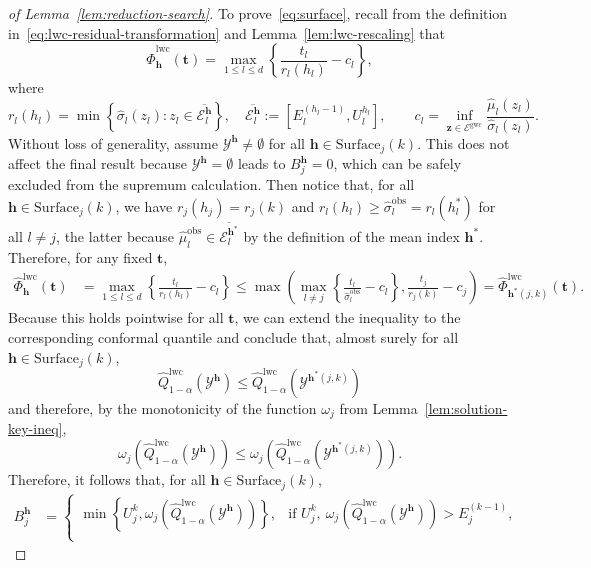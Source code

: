 \begin{proof}[of Lemma~\ref{lem:reduction-search}]
To prove~\eqref{eq:surface}, recall from the definition in~\eqref{eq:lwc-residual-transformation} and Lemma~\ref{lem:lwc-rescaling} that
\[
\hat{\Phi}^{\mathrm{lwc}}_{\mathbf{h}}(\mathbf t)  = \max_{1\leq l \leq d} \left\{\frac{t_l}{r_l(h_l)} - c_l\right\},
\]
where
\[
r_l(h_l) = \min\left\{\hat{\sigma}_l(z_l): z_l \in \overline{\mathcal{E}^{\mathbf{h}}_l}\right\},
\quad \overline{\mathcal{E}^{\mathbf{h}}_l} := \left[E^{(h_l-1)}_l, U^{h_l}_l\right],
\qquad c_l = \inf_{\mathbf z \in \mathcal{E}^{\mathrm{gwc}}}\frac{\hat{\mu}_l(z_l)}{\hat{\sigma}_l(z_l)}.
\]
Without loss of generality, assume $\mathcal{Y}^{\mathbf{h}} \neq \emptyset$ for all $\mathbf{h} \in \mathrm{Surface}_j(k)$. This does not affect the final result because $\mathcal{Y}^{\mathbf{h}} = \emptyset$ leads to $B^{\mathbf{h}}_j = 0$, which can be safely excluded from the supremum calculation. Then notice that, for all $\mathbf{h} \in \mathrm{Surface}_j(k)$, we have $r_j(h_j) = r_j(k)$ and $r_l(h_l) \geq \hat{\sigma}^\mathrm{obs}_l = r_l({h^*_l})$ for all $l \neq j$, the latter because $\hat{\mu}^\mathrm{obs}_l \in \overline{\mathcal{E}^{\mathbf{h}^*}_l}$ by the definition of the mean index $\mathbf{h}^*$. Therefore, for any fixed $\mathbf t$,
\begin{align*}
    \hat{\Phi}^{\mathrm{lwc}}_{\mathbf{h}}(\mathbf t) & = \max_{1\leq l \leq d} \left\{\frac{t_l}{r_l(h_l)} - c_l\right\}
    \leq  \max\left(\max_{l\neq j} \left\{\frac{t_l}{\hat{\sigma}^\mathrm{obs}_l} - c_l\right\}, \frac{t_j}{r_j(k)} - c_j\right)
    = \hat{\Phi}^{\mathrm{lwc}}_{\mathbf{h}^*(j,k)}(\mathbf t).
\end{align*}
Because this holds pointwise for all $\mathbf t$, we can extend the inequality to the corresponding conformal quantile and conclude that, almost surely for all $\mathbf{h} \in \mathrm{Surface}_j(k)$,
\[
\hat{Q}^\mathrm{lwc}_{1-\alpha}(\mathcal{Y}^{\mathbf{h}}) \leq \hat{Q}^\mathrm{lwc}_{1-\alpha}(\mathcal{Y}^{\mathbf{h}^*(j,k)})
\]
and therefore, by the monotonicity of the function $\omega_j$ from Lemma~\ref{lem:solution-key-ineq},
\[
\omega_j(\hat{Q}^\mathrm{lwc}_{1-\alpha}(\mathcal{Y}^{\mathbf{h}})) \leq \omega_j(\hat{Q}^\mathrm{lwc}_{1-\alpha}(\mathcal{Y}^{\mathbf{h}^*(j,k)})).
\]
Therefore, it follows that, for all $\mathbf{h} \in \mathrm{Surface}_j(k)$,
\begin{align*}
B^{\mathbf{h}}_j &=\begin{cases}
\min\left\{U^{k}_j, \omega_j(\hat{Q}^{\mathrm{lwc}}_{1-\alpha}(\mathcal{Y}^{\mathbf{h}}))\right\},
& \text{if } U^{k}_j,\ \omega_j(\hat{Q}^{\mathrm{lwc}}_{1-\alpha}(\mathcal{Y}^{\mathbf{h}})) > E^{(k-1)}_j,\\[0.4em]

\end{cases}
\end{align*}
\end{proof}
